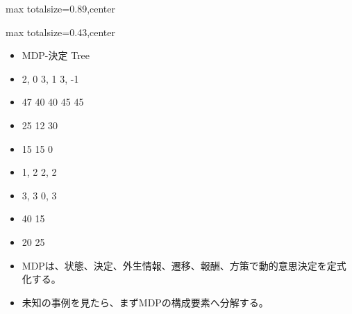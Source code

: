\begin{minipage}[t]{0.58\textwidth}
\begin{adjustbox}{max totalsize={\textwidth}{0.89\textheight},center}
\begin{minipage}{\textwidth}
\end{minipage}
\end{adjustbox}
\end{minipage}


\clearpage
{}
\begin{minipage}[t]{0.405\textwidth}
\begin{adjustbox}{max totalsize={\textwidth}{0.43\textheight},center}
\begin{minipage}{\textwidth}\scriptsize
{}\begin{itemize}
\item MDP-決定 Tree
\item 2, 0 3, 1 3, -1
\item 47 40 40 45 45
\item 25 12 30
\item 15 15 0
\item 1, 2 2, 2
\item 3, 3 0, 3
\item 40 15
\item 20 25
\end{itemize}\begin{itemize}
\item MDPは、状態、決定、外生情報、遷移、報酬、方策で動的意思決定を定式化する。
\item 未知の事例を見たら、まずMDPの構成要素へ分解する。
\end{itemize}
\end{minipage}
\end{adjustbox}
\end{minipage}\hfill
